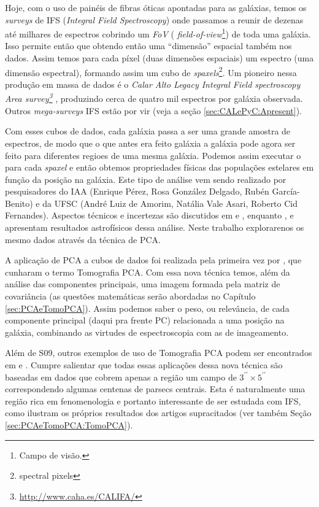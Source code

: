 Hoje, com o uso de painéis de fibras óticas apontadas para as galáxias, temos os {\em surveys} de IFS ({\em Integral
Field Spectroscopy}) onde passamos a reunir de dezenas até milhares de espectros cobrindo um {\em FoV} ({\em
field-of-view}\footnote{Campo de visão.}) de toda uma galáxia. Isso permite então que obtendo então uma ``dimensão''
espacial também nos dados. Assim temos para cada píxel (duas dimensões espaciais) um espectro (uma dimensão espectral),
formando assim um cubo de {\em spaxels}\footnote{spectral pixels}. Um pioneiro nessa produção em massa de dados é o {\em
Calar Alto Legacy Integral Field spectroscopy Area survey\footnote{\url{http://www.caha.es/CALIFA/}}} \citep[CALIFA;
][]{CALIFAPresent2012}, produzindo cerca de quatro mil espectros por galáxia observada. Outros {\em mega-surveys} IFS
estão por vir (veja a seção \ref{sec:CALePyC:Apresent}).

Com esses cubos de dados, cada galáxia passa a ser uma grande amostra de espectros, de modo que o que antes era feito
galáxia a galáxia pode agora ser feito para diferentes regioes de uma mesma galáxia. Podemos assim executar o \starlight
para cada {\em spaxel} e então obtemos propriedades físicas das populações estelares em função da posição na galáxia.
Este tipo de análise vem sendo realizado por pesquisadores do IAA (Enrique Pérez, Rosa González Delgado, Rubén
García-Benito) e da UFSC (André Luiz de Amorim, Natália Vale Asari, Roberto Cid Fernandes). Aspectos técnicos e
incertezas são discutidos em \citet[][CF13 daqui pra frente]{CidFernandes2013} e \citet{CidFernandes2014}, enquanto
\citet{Perez2013}, e \citet{GonzalezDelgado2014} apresentam resultados astrofísicos dessa análise. Neste trabalho
explorarenos os mesmo dados através da técnica de PCA.

A aplicação de PCA a cubos de dados foi realizada pela primeira vez por \citet[][S09 daqui pra frente]{Steiner2009},
que cunharam o termo Tomografia PCA. Com essa nova técnica temos, além da análise das componentes principais, uma imagem formada pela matriz
de covariância (as questões matemáticas serão abordadas no Capítulo \ref{sec:PCAeTomoPCA}). Assim podemos saber o peso,
ou relevância, de cada componente principal (daqui pra frente PC) relacionada a uma posição na galáxia, combinando as
virtudes de espectroscopia com as de imageamento.

Além de S09, outros exemplos de uso de Tomografia PCA podem ser encontrados em \citet{Riffel2011} e \citet{Ricci2011}.
Cumpre salientar que todas essas aplicações dessa nova técnica são baseadas em dados que cobrem apenas a região um campo
de $3^{\prime\prime} \times 5^{\prime\prime}$ correspondendo algumas centenas de parsecs centrais. Esta é naturalmente
uma região rica em fenomenologia e portanto interessante de ser estudada com IFS, como ilustram os próprios resultados
dos artigos supracitados (ver também Seção \ref{sec:PCAeTomoPCA:TomoPCA}).

